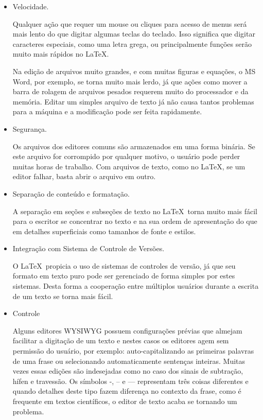 \begin{itemize}
\item Velocidade.

Qualquer ação que requer um mouse ou cliques para acesso de menus será mais lento do que digitar algumas teclas do teclado. Isso significa que digitar caracteres especiais, como uma letra grega, ou principalmente funções serão muito mais rápidos no \LaTeX.

Na edição de arquivos muito grandes, e com muitas figuras e equações, o MS Word, por exemplo, se torna muito mais lerdo, já que ações como mover a barra de rolagem de arquivos pesados requerem muito do processador e da memória. Editar um simples arquivo de texto já não causa tantos problemas para a máquina e a modificação pode ser feita rapidamente.

\item Segurança.

Os arquivos dos editores comuns são armazenados em uma forma binária. Se este arquivo for corrompido por qualquer motivo, o usuário pode perder muitas horas de trabalho. Com arquivos de texto, como no \LaTeX, se um editor falhar, basta abrir o arquivo em outro.

\item Separação de conteúdo e formatação.

A separação em seções e subseções de texto no \LaTeX\ torna muito mais fácil para o escritor se concentrar no texto e na sua ordem de apresentação do que em detalhes superficiais como tamanhos de fonte e estilos.

\item Integração com Sistema de Controle de Versões.

  O \LaTeX\ propicia o uso de sistemas de controles de versão, já que seu formato em texto puro pode ser gerenciado de forma simples por estes sistemas. Desta forma a cooperação entre múltiplos usuários durante a escrita de um texto se torna mais fácil.


\item Controle

Alguns editores WYSIWYG possuem configurações prévias que almejam facilitar a digitação de um texto e nestes casos os editores agem sem permissão do usuário, por exemplo: auto-capitalizando as primeiras palavras de uma frase ou selecionando automaticamente sentenças inteiras. Muitas vezes essas edições são indesejadas como no caso dos sinais de subtração, hífen e travessão. Os símbolos -, -- e --- representam três coisas diferentes e quando detalhes deste tipo fazem diferença no contexto da frase, como é frequente em textos científicos, o editor de texto acaba se tornando um problema.


\end{itemize}
